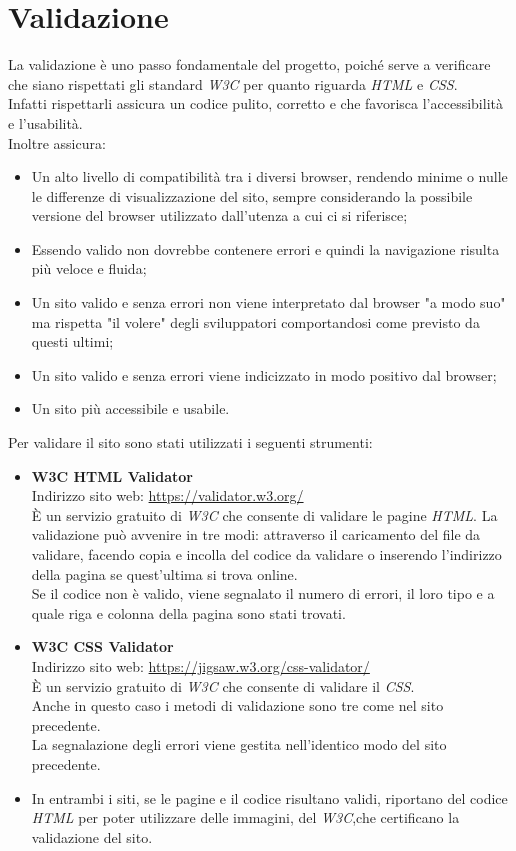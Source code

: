 \section{Validazione}
La validazione è uno passo fondamentale del progetto, poiché serve a verificare che siano rispettati gli standard \emph{W3C} per quanto riguarda \emph{HTML} e \emph{CSS}.\\
Infatti rispettarli assicura un codice pulito, corretto e che favorisca l'accessibilità e l'usabilità.\\
Inoltre assicura:
\begin{itemize}
	\item Un alto livello di compatibilità tra i diversi browser, rendendo minime o nulle le differenze di visualizzazione del sito, sempre considerando la possibile versione del browser utilizzato dall'utenza a cui ci si riferisce;
	\item Essendo valido non dovrebbe contenere errori e quindi la navigazione risulta più veloce e fluida;
	\item Un sito valido e senza errori non viene interpretato dal browser "a modo suo" ma rispetta "il volere" degli sviluppatori comportandosi come previsto da questi ultimi;
	\item Un sito valido e senza errori viene indicizzato in modo positivo dal browser;
	\item Un sito più accessibile e usabile.
\end{itemize}
Per validare il sito sono stati utilizzati i seguenti strumenti:
\begin{itemize}
	\item \textbf{W3C HTML Validator}\\
	Indirizzo sito web: \url{https://validator.w3.org/}\\
	È un servizio gratuito di \emph{W3C} che consente di validare le pagine \emph{HTML}.
	La validazione può avvenire in tre modi: attraverso il caricamento del file da validare, facendo copia e incolla del codice da validare o inserendo l'indirizzo della pagina se quest'ultima si trova online.\\
	Se il codice non è valido, viene segnalato il numero di errori, il loro tipo e a quale riga e colonna della pagina sono stati trovati.
	\item \textbf{W3C CSS Validator}\\
	Indirizzo sito web: \url{https://jigsaw.w3.org/css-validator/}\\
	È un servizio gratuito di \emph{W3C} che consente di validare il \emph{CSS}.\\
	Anche in questo caso i metodi di validazione sono tre come nel sito precedente.\\
	La segnalazione degli errori viene gestita nell'identico modo del sito precedente.\\
	 \item In entrambi i siti, se le pagine e il codice risultano validi, riportano del codice \emph{HTML} per poter utilizzare delle immagini, del \emph{W3C},che certificano la validazione del sito.
\end{itemize}